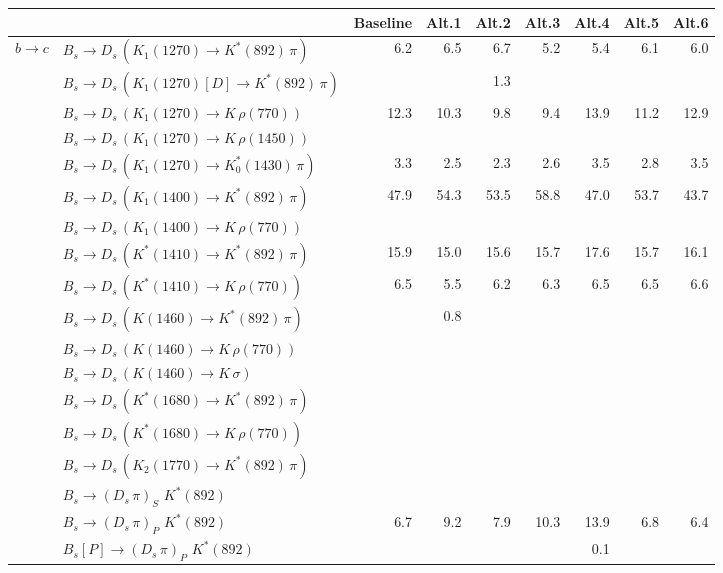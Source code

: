 \begin{tabular}{l l  r  r  r  r  r  r  r  } 
\hline
\hline
& & \multicolumn{1}{c}{Baseline}  & \multicolumn{1}{c}{Alt.1}  & \multicolumn{1}{c}{Alt.2}  & \multicolumn{1}{c}{Alt.3}  & \multicolumn{1}{c}{Alt.4}  & \multicolumn{1}{c}{Alt.5}  & \multicolumn{1}{c}{Alt.6}  \\ 
\hline
\multirow{30}{*}{$b \to c$}  & $B_s \to D_s \, ( K_1(1270) \to K^{*}(892) \, \pi )$ & 6.2 & 6.5 & 6.7 & 5.2 & 5.4 & 6.1 & 6.0 \\ 
 & $B_s \to D_s \, ( K_1(1270)[D] \to K^{*}(892) \, \pi )$ &  &  & 1.3 &  &  &  &  \\ 
 & $B_s \to D_s \, ( K_1(1270) \to K \, \rho(770) )$ & 12.3 & 10.3 & 9.8 & 9.4 & 13.9 & 11.2 & 12.9 \\ 
 & $B_s \to D_s \, ( K_1(1270) \to K \, \rho(1450) )$ &  &  &  &  &  &  &  \\ 
 & $B_s \to D_s \, ( K_1(1270) \to K^{*}_{0}(1430) \, \pi )$ & 3.3 & 2.5 & 2.3 & 2.6 & 3.5 & 2.8 & 3.5 \\ 
 & $B_s \to D_s \, ( K_1(1400) \to K^{*}(892) \, \pi )$ & 47.9 & 54.3 & 53.5 & 58.8 & 47.0 & 53.7 & 43.7 \\ 
 & $B_s \to D_s \, ( K_1(1400) \to K \, \rho(770) )$ &  &  &  &  &  &  &  \\ 
 & $B_s \to D_s \, ( K^{*}(1410) \to K^{*}(892) \, \pi )$ & 15.9 & 15.0 & 15.6 & 15.7 & 17.6 & 15.7 & 16.1 \\ 
 & $B_s \to D_s \, ( K^{*}(1410) \to K \, \rho(770) )$ & 6.5 & 5.5 & 6.2 & 6.3 & 6.5 & 6.5 & 6.6 \\ 
 & $B_s \to D_s \, ( K(1460) \to K^{*}(892) \, \pi )$ &  & 0.8 &  &  &  &  &  \\ 
 & $B_s \to D_s \, ( K(1460) \to K \, \rho(770) )$ &  &  &  &  &  &  &  \\ 
 & $B_s \to D_s \, ( K(1460) \to K \, \sigma )$ &  &  &  &  &  &  &  \\ 
 & $B_s \to D_s \, ( K^{*}(1680) \to K^{*}(892) \, \pi )$ &  &  &  &  &  &  &  \\ 
 & $B_s \to D_s \, ( K^{*}(1680) \to K \, \rho(770) )$ &  &  &  &  &  &  &  \\ 
 & $B_s \to D_s \, ( K_2(1770) \to K^{*}(892) \, \pi )$ &  &  &  &  &  &  &  \\ 
 & $B_s \to ( D_s \, \pi)_{S} \, \, K^{*}(892)$ &  &  &  &  &  &  &  \\ 
 & $B_s \to ( D_s \, \pi)_{P} \, \, K^{*}(892)$ & 6.7 & 9.2 & 7.9 & 10.3 & 13.9 & 6.8 & 6.4 \\ 
 & $B_s[P] \to ( D_s \, \pi)_{P} \, \, K^{*}(892)$ &  &  &  &  & 0.1 &  &  \\ 

\end{tabular}
